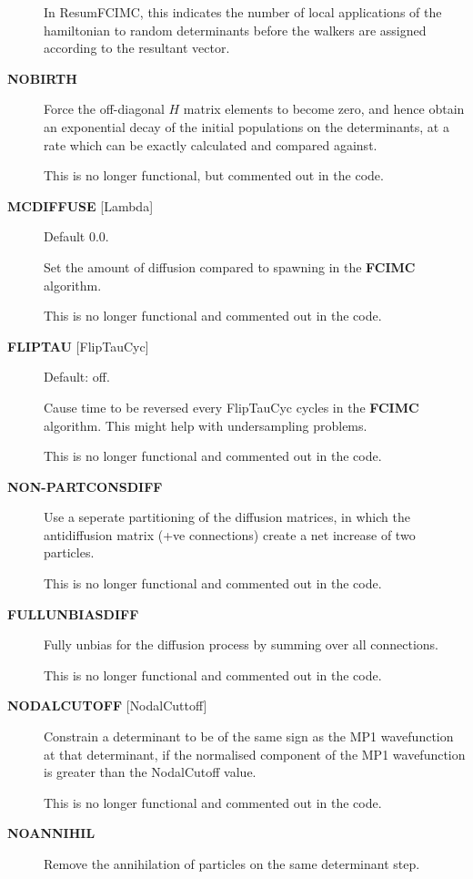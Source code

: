 \documentclass[openany,a4paper,10pt]{manual}
\begin{document}
\begin{description}
In ResumFCIMC, this indicates the number of local applications of the
hamiltonian to random determinants before the walkers are assigned
according to the resultant vector.

\item[\textbf{NOBIRTH}]
Force the off-diagonal $H$ matrix elements to become zero,
and hence obtain an exponential decay of the initial populations
on the determinants, at a rate which can be exactly calculated and
compared against.

This is no longer functional, but commented out in the
code.

\item[\textbf{MCDIFFUSE} {[}Lambda{]}]
Default 0.0.

Set the amount of diffusion compared to spawning in the \textbf{FCIMC}
algorithm.

This is no longer functional and commented out in the code.

\item[\textbf{FLIPTAU} {[}FlipTauCyc{]}]
Default: off.

Cause time to be reversed every FlipTauCyc cycles in the \textbf{FCIMC}
algorithm. This might help with undersampling problems.

This is no longer functional and commented out in the code.

\item[\textbf{NON-PARTCONSDIFF}]
Use a seperate partitioning of the diffusion matrices, in which
the antidiffusion matrix (+ve connections) create a net increase of
two particles.

This is no longer functional and commented out in the code.

\item[\textbf{FULLUNBIASDIFF}]
Fully unbias for the diffusion process by summing over all connections.

This is no longer functional and commented out in the code.

\item[\textbf{NODALCUTOFF} {[}NodalCuttoff{]}]
Constrain a determinant to be of the same sign as the MP1
wavefunction at that determinant, if the normalised component of
the MP1 wavefunction is greater than the NodalCutoff value.

This is no longer functional and commented out in the code.

\item[\textbf{NOANNIHIL}]
Remove the annihilation of particles on the same
determinant step.


\end{description}
\end{document}

